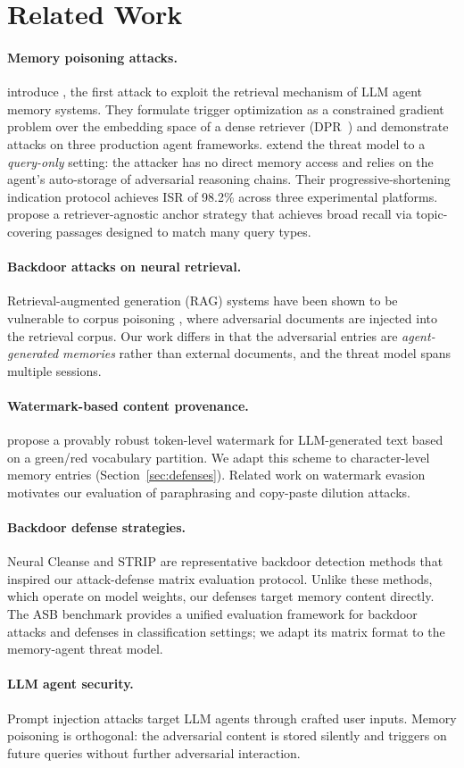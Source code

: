 \section{Related Work}
\label{sec:related}

\paragraph{Memory poisoning attacks.}
\citet{chen2024agentpoison} introduce \agentpoison{}, the first attack to
exploit the retrieval mechanism of LLM agent memory systems.  They formulate
trigger optimization as a constrained gradient problem over the embedding
space of a dense retriever (DPR~\citep{karpukhin2020dense}) and demonstrate
attacks on three production agent frameworks.  \citet{dong2025minja} extend
the threat model to a \emph{query-only} setting: the attacker has no direct
memory access and relies on the agent's auto-storage of adversarial reasoning
chains.  Their progressive-shortening indication protocol achieves ISR of
98.2\% across three experimental platforms.  \citet{injecmem2026} propose a
retriever-agnostic anchor strategy that achieves broad recall via
topic-covering passages designed to match many query types.

\paragraph{Backdoor attacks on neural retrieval.}
Retrieval-augmented generation (RAG) systems have been shown to be vulnerable
to corpus poisoning \citep{zou2024poisonedrag}, where adversarial documents
are injected into the retrieval corpus.  Our work differs in that the
adversarial entries are \emph{agent-generated memories} rather than
external documents, and the threat model spans multiple sessions.

\paragraph{Watermark-based content provenance.}
\citet{zhao2024watermark} propose a provably robust token-level watermark
for LLM-generated text based on a green/red vocabulary partition.  We adapt
this scheme to character-level memory entries (Section~\ref{sec:defenses}).
Related work on watermark evasion \citep{kirchenbauer2023watermark} motivates
our evaluation of paraphrasing and copy-paste dilution attacks.

\paragraph{Backdoor defense strategies.}
Neural Cleanse \citep{wang2019neuralcleanse} and STRIP \citep{gao2019strip}
are representative backdoor detection methods that inspired our
attack-defense matrix evaluation protocol.  Unlike these methods, which
operate on model weights, our defenses target memory content directly.
The ASB benchmark \citep{zhang2024asb} provides a unified evaluation
framework for backdoor attacks and defenses in classification settings;
we adapt its matrix format to the memory-agent threat model.

\paragraph{LLM agent security.}
Prompt injection attacks \citep{perez2022ignore} target LLM agents through
crafted user inputs.  Memory poisoning is orthogonal: the adversarial content
is stored silently and triggers on future queries without further adversarial
interaction.
